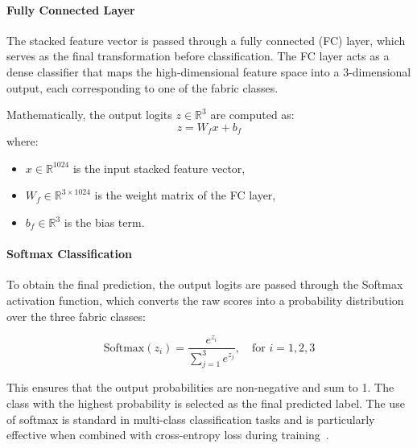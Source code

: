 \paragraph{Fully Connected Layer}

The stacked feature vector is passed through a fully connected (FC) layer, which serves as the final transformation before classification. The FC layer acts as a dense classifier that maps the high-dimensional feature space into a 3-dimensional output, each corresponding to one of the fabric classes.

Mathematically, the output logits \( z \in \mathbb{R}^3 \) are computed as:
\[
z = W_f x + b_f
\]
where:
\begin{itemize}[noitemsep,topsep=0pt]
    \item \( x \in \mathbb{R}^{1024} \) is the input stacked feature vector,
    \item \( W_f \in \mathbb{R}^{3 \times 1024} \) is the weight matrix of the FC layer,
    \item \( b_f \in \mathbb{R}^{3} \) is the bias term.
\end{itemize}

\paragraph{Softmax Classification}

To obtain the final prediction, the output logits are passed through the Softmax activation function, which converts the raw scores into a probability distribution over the three fabric classes:

\[
\text{Softmax}(z_i) = \frac{e^{z_i}}{\sum_{j=1}^{3} e^{z_j}}, \quad \text{for } i = 1,2,3
\]

This ensures that the output probabilities are non-negative and sum to 1. The class with the highest probability is selected as the final predicted label. The use of softmax is standard in multi-class classification tasks and is particularly effective when combined with cross-entropy loss during training~\cite{bishop2006pattern, goodfellow2016deep}.